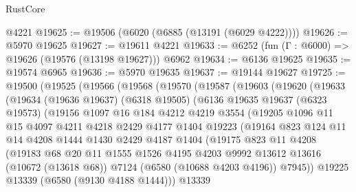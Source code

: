 \begin{lexlean}{RustCore}
\begin{coremodule}
    @4221
@19625 := @19506 (@6020 (@6885 (@13191 (@6029 @4222))))
@19626 := @5970 @19625
@19627 := @19611 @4221
@19633 := @6252 (fun (Γ : @6000) => @19626 (@19576 (@13198 @19627))) @6962
@19634 := @6136 @19625
@19635 := @19574 @6965
@19636 := @5970 @19635
@19637 := @19144 @19627
@19725 := @19500
    (@19525
      (@19566
        (@19568
          (@19570
            (@19587
              (@19603
                (@19620
                  (@19633
                    (@19634
                      (@19636 @19637)
                      (@6318 @19505)
                      (@6136
                        @19635
                        @19637
                        (@6323 @19573)
                        (@19156
                          @1097
                          @16
                          @184
                          @4212
                          @4219
                          @3554
                          (@19205
                            @1096
                            @11
                            @15
                            @4097
                            @4211
                            @4218
                            @2429
                            @4177
                            @1404
                            @19223
                            (@19164
                              @823
                              @124
                              @11
                              @14
                              @4208
                              @1444
                              @1430
                              @2429
                              @4187
                              @1404
                              (@19175
                                @823
                                @11
                                @4208
                                (@19183
                                  @68
                                  @20
                                  @11
                                  @1555
                                  @1526
                                  @4195
                                  @4203
                                  @9992
                                  @13612
                                  @13616
                                  (@10672 (@13618 @68))
                                  @7124
                                  (@6580 (@10688 @4203 @4196))
                                  @7945))
                              @19225
                              @13339
                              (@6580 (@9130 @4188 @1444)))
                            @13339

\end{coremodule}
\end{lexlean}
